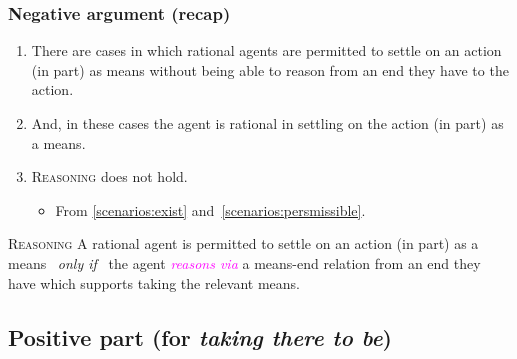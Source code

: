 \documentclass[noamssymb,
graphics,
]{beamer} %
\newcommand{\hand}{\ding{43}}
\newcommand{\schemaName}[1]{\textsc{#1}}
\newcommand{\hozlinedash}[0]{
  \noindent\hdashrule[0.5ex][c]{\textwidth}{.1pt}{2.5pt}
}
\begin{document}
\begin{frame}
  \frametitle{Negative argument (recap)}

  {%
  \begin{enumerate}
    \item There are cases in which rational agents are permitted to settle on an action (in part) as means without being able to reason from an end they have to the action.
  \item And, in these cases the agent is rational in settling on the action (in part) as a means.
  \item \schemaName{Reasoning} does not hold.
    \begin{itemize}
    \item From \ref{scenarios:exist} and~\ref{scenarios:persmissible}.
    \end{itemize}
  \end{enumerate}
  }

  \hozlinedash
  {%
    \begin{block}{\schemaName{Reasoning}}
      A rational agent is permitted to settle on an action (in part) as a means
      \newline
      \mbox{ }\hfill\emph{only if}\hfill\mbox{ }
      \newline
      the agent \textcolor{fuchsia}{\emph{reasons via}} a means-end relation from an end they have which supports taking the relevant means.
    \end{block}
  }
\end{frame}

\subsection{Positive part (for \emph{taking there to be})}%
\label{sec:positive}
\end{document}
